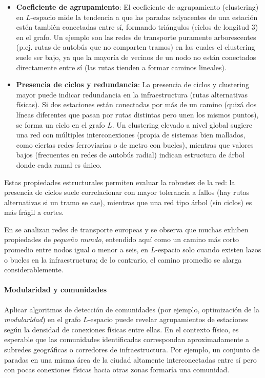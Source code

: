             \begin{itemize}
                \item \textbf{Coeficiente de agrupamiento}: El coeficiente de agrupamiento (clustering) en $L\text{-espacio}$ mide la tendencia a que las paradas adyacentes de una estación estén también conectadas entre sí, formando triángulos (ciclos de longitud 3) en el grafo. Un ejemplo son las redes de transporte puramente arborescentes (p.ej. rutas de autobús que no comparten tramos) en las cuales el clustering suele ser bajo, ya que la mayoría de vecinos de un nodo no están conectados directamente entre sí (las rutas tienden a formar caminos lineales).

                \item \textbf{Presencia de ciclos y redundancia}: La presencia de ciclos y clustering mayor puede indicar redundancia en la infraestructura (rutas alternativas físicas). Si dos estaciones están conectadas por más de un camino (quizá dos líneas diferentes que pasan por rutas distintas pero unen los mismos puntos), se forma un ciclo en el grafo $L$. Un clustering elevado a nivel global sugiere una red con múltiples interconexiones (propia de sistemas bien mallados, como ciertas redes ferroviarias o de metro con bucles), mientras que valores bajos (frecuentes en redes de autobús radial) indican estructura de árbol donde cada ramal es único.
            \end{itemize}

            Estas propiedades estructurales permiten evaluar la robustez de la red: la presencia de ciclos suele correlacionar con mayor tolerancia a fallos (hay rutas alternativas si un tramo se cae), mientras que una red tipo árbol (sin ciclos) es más frágil a cortes.

            En \cite{vanferber2009} se analizan redes de transporte europeas y se observa que muchas exhiben propiedades de \textit{pequeño mundo}, entendido aquí como un camino más corto promedio entre nodos igual o menor a seis, en $L\text{-espacio}$ solo cuando existen lazos o bucles en la infraestructura; de lo contrario, el camino promedio se alarga considerablemente.

            \paragraph{Modularidad y comunidades}
            Aplicar algoritmos de detección de comunidades (por ejemplo, optimización de la \textit{modularidad}) en el grafo $L\text{-espacio}$ puede revelar agrupamientos de estaciones según la densidad de conexiones físicas entre ellas. En el contexto físico, es esperable que las comunidades identificadas correspondan aproximadamente a subredes geográficas o corredores de infraestructura. Por ejemplo, un conjunto de paradas en una misma área de la ciudad altamente interconectadas entre sí pero con pocas conexiones físicas hacia otras zonas formaría una comunidad.


